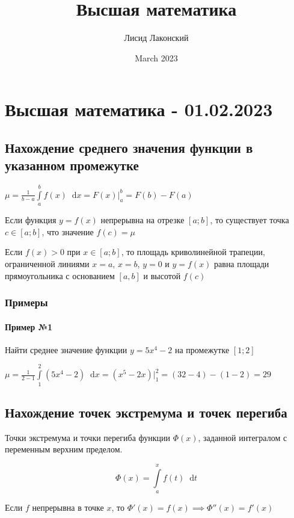 \documentclass{article}
\title{Высшая математика}
\author{Лисид Лаконский}
\date{March 2023}
\newcommand*\diff{\mathop{}\!\mathrm{d}}
\begin{document}
\raggedright

\maketitle

\tableofcontents
\pagebreak

\section{Высшая математика - 01.02.2023}

\subsection{Нахождение среднего значения функции в указанном промежутке}

$\mu = \frac{1}{b - a} \int\limits_{a}^{b} f(x) \diff x = F(x)\bigg|_{a}^{b} = F(b) - F(a)$

Если функция $y = f(x)$ непрерывна на отрезке $[a; b]$, то существует точка $c \in [ a; b ]$, что значение $f(c) = \mu$

Если $f(x) > 0$ при $x \in [a; b]$, то площадь криволинейной трапеции, ограниченной линиями $x = a$, $x = b$, $y = 0$ и $y = f(x)$ равна площади прямоугольника с основанием $[a, b]$ и высотой $f(c)$

\subsubsection{Примеры}

\paragraph{Пример №1} Найти среднее значение функции $y = 5x^4 - 2$ на промежутке $[1; 2]$

$\mu = \frac{1}{2 - 1} \int\limits_{1}^{2} (5x^4 - 2) \diff x = (x^5 - 2x) \bigg|_{1}^{2} = (32 - 4) - (1 - 2) = 29$

\subsection{Нахождение точек экстремума и точек перегиба}

Точки экстремума и точки перегиба функции $\Phi (x)$, заданной интегралом с переменным верхним пределом.

$$
\Phi(x) = \int\limits_{a}^{x} f(t) \diff t
$$

Если $f$ непрерывна в точке $x$, то $\Phi'(x) = f(x) \implies \Phi''(x) = f'(x)$
\end{document}
